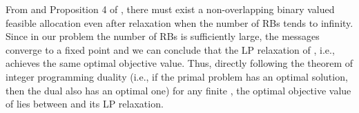 \documentclass[twocolumn,10pt]{IEEEtran}
\begin{document}
From \cite{large-rb-dual} and Proposition 4 of \cite{mp-convergence-proof},  there must exist a non-overlapping binary valued feasible allocation even after relaxation when the number of RBs tends to infinity. Since in our problem the number of RBs is sufficiently large, the messages converge to a fixed point and we can conclude that the LP relaxation of , i.e.,  achieves the same optimal objective value. Thus, directly following the theorem of integer programming duality (i.e., if the primal problem has an optimal solution, then the dual also has an optimal one) for any finite , the optimal objective value of  lies between  and its LP relaxation.







\end{document}
